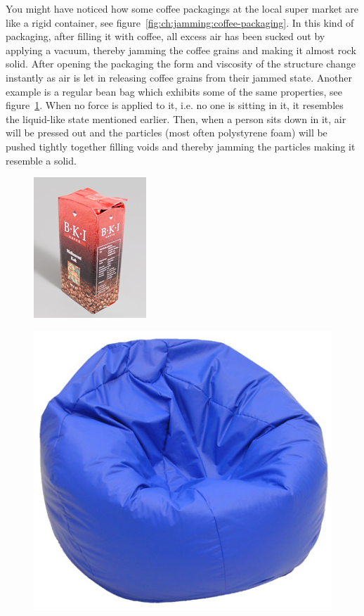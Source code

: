 You might have noticed how some coffee packagings at the local super market are like a rigid container, see figure~\ref{fig:ch:jamming:coffee-packaging}. 
In this kind of packaging, after filling it with coffee, all excess air has been sucked out by applying a vacuum, thereby jamming the coffee grains and making it almost rock solid. 
After opening the packaging the form and viscosity of the structure change instantly as air is let in releasing coffee grains from their jammed state.
Another example is a regular bean bag which exhibits some of the same properties, see figure~\ref{fig:ch:jamming:bean-bag}. 
When no force is applied to it, i.e. no one is sitting in it, it resembles the liquid-like state mentioned earlier. 
Then, when a person sits down in it, air will be pressed out and the particles (most often polystyrene foam) will be pushed tightly together filling voids and thereby jamming the particles making it resemble a solid.

\begin{figure}[h]
\centering
\begin{minipage}[t]{.44\textwidth}
  \centering
  \includegraphics[width=.5\linewidth]{figures/jamming/coffee_packaging}
  \label{fig:ch:jamming:coffee-packaging}
\end{minipage}%
\hspace{0.02\textwidth}
\begin{minipage}[t]{.44\textwidth}
  \centering
  \includegraphics[width=.5\linewidth]{figures/jamming/bean_bag}
  \label{fig:ch:jamming:bean-bag}
\end{minipage}
\end{figure}

